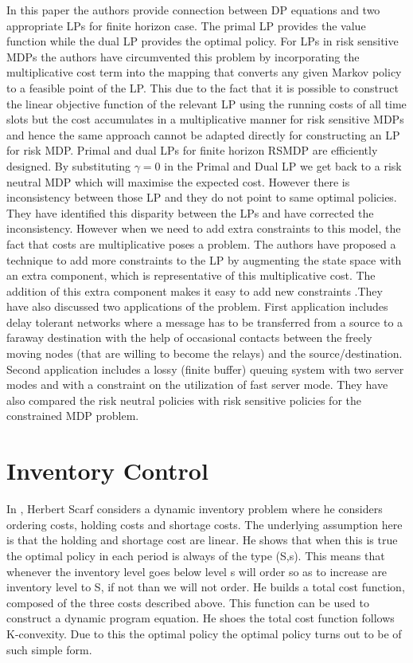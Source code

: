 \documentclass[11pt,a4paper,oneside]{report}
\begin{document}
In this paper the authors provide connection between DP equations and two appropriate LPs for finite horizon case. The primal LP provides the value function while the dual LP provides the optimal policy. For LPs in risk sensitive MDPs the authors have circumvented this problem by incorporating the multiplicative cost term into the mapping that converts any given Markov policy to a feasible point of the LP. This due to the fact that it is possible to construct the linear objective function of the relevant LP using the running costs of all time slots but the cost accumulates in a multiplicative manner for risk sensitive MDPs and hence the same approach cannot be adapted directly for constructing an LP for risk MDP. Primal and dual LPs for finite horizon RSMDP are efficiently designed.  By substituting $\gamma=0$ in the Primal and Dual LP we get back to a risk neutral MDP which will maximise the expected cost. However there is inconsistency between those LP and they do not point to same optimal policies. They have identified this disparity between the LPs and have corrected the inconsistency. However when we need to add extra constraints to this model, the fact that costs are multiplicative poses a problem. The authors have proposed a technique to add more constraints to the LP by augmenting the state space with an extra component, which is representative of this multiplicative cost. The addition of this extra component makes it easy to add new constraints .They have also discussed two applications of the problem. First application includes delay tolerant networks where a message has to be transferred from a source to a faraway destination with the help of occasional contacts between the freely moving nodes (that are willing to become the relays) and the source/destination. Second application includes a lossy (finite buffer) queuing system with two server modes and with a constraint on the utilization of fast server mode. They have also compared the risk neutral policies with risk sensitive policies for the constrained MDP problem.\\

\section{Inventory Control}
In \cite{scarf1959optimality}, Herbert Scarf considers a dynamic inventory problem where he considers ordering costs, holding costs and shortage costs. The underlying assumption here is that the holding and shortage cost are linear. He shows that when this is true the optimal policy in each period is always of the type (S,s). This means that whenever the inventory level goes below level s will order so as to increase are inventory level to S, if not than we will not order. He builds a total cost function, composed of the three costs described above. This function can be used to construct a dynamic program equation. He shoes the total cost function follows K-convexity. Due to this the optimal policy the optimal policy turns out to be of such simple form.\\
\end{document}
